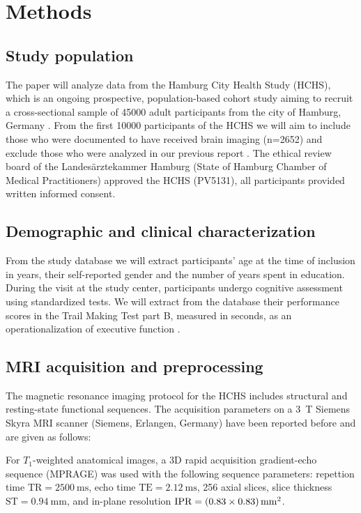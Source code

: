 \section{Methods} \label{methods}

\subsection{Study population}
The paper will analyze data from the Hamburg City Health Study (HCHS), which is an ongoing prospective, population-based cohort study aiming to recruit a cross-sectional sample of \num{45000} adult participants from the city of Hamburg, Germany \citep{Jagodzinski2020-lx}.
From the first \num{10000} participants of the HCHS we will aim to include those who were documented to have received brain imaging (n=2652) and exclude those who were analyzed in our previous report \citep{Schlemm2022-he}.
The ethical review board of the Landesärztekammer Hamburg (State of Hamburg Chamber of Medical Practitioners) approved the HCHS (PV5131), all participants provided written informed consent.

\subsection{Demographic and clinical characterization}
From the study database we will extract participants’ age at the time of inclusion in years, their self-reported gender and the number of years spent in education.
During the visit at the study center, participants undergo cognitive assessment using standardized tests.
We will extract from the database their performance scores in the Trail Making Test part B, measured in seconds, as an operationalization of executive function \citep{Tombaugh2004-dp}.

\subsection{MRI acquisition and preprocessing}
The magnetic resonance imaging protocol for the HCHS includes structural and resting-state functional sequences.
The acquisition parameters on a \qty{3}{\tesla} Siemens Skyra MRI scanner (Siemens, Erlangen, Germany) have been reported before \citep{Petersen2020-cx,Frey2021-sv} and are given as follows:

For $T_1$-weighted anatomical images, a 3D rapid acquisition gradient-echo sequence (MPRAGE) was used with the following sequence parameters: repettion time $\text{TR} = \qty{2500}{\ms}$, echo time $\text{TE} = \qty{2.12}{\ms}$, 256 axial slices, slice thickness $\text{ST} = \qty{0.94}{\mm}$, and in-plane resolution  $\text{IPR} = \qtyproduct[product-units = bracket-power]{0.83 x 0.83}{\mm}$.


